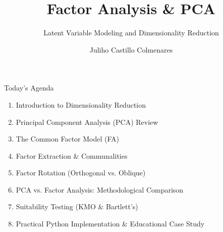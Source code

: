 \documentclass[aspectratio=169,ignorenonframetext]{beamer}
\title{\texorpdfstring{Factor Analysis \& PCA}{Factor Analysis \& PCA}}
\author{\texorpdfstring{Juliho Castillo
Colmenares}{Juliho Castillo Colmenares}}
\subtitle{Latent Variable Modeling and Dimensionality Reduction}
\institute{Tec de Monterrey}
\date{}
\begin{document}
\frame{\titlepage}

\begin{frame}{Today's Agenda}
\begin{enumerate}
\item
  Introduction to Dimensionality Reduction
\item
  Principal Component Analysis (PCA) Review
\item
  The Common Factor Model (FA)
\item
  Factor Extraction \& Communalities
\item
  Factor Rotation (Orthogonal vs. Oblique)
\item
  PCA vs. Factor Analysis: Methodological Comparison
\item
  Suitability Testing (KMO \& Bartlett's)
\item
  Practical Python Implementation \& Educational Case Study
\end{enumerate}
\end{frame}
\end{document}
